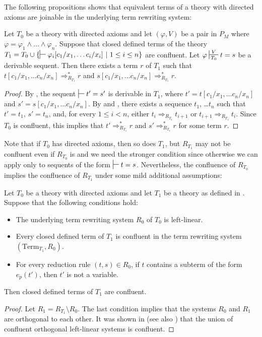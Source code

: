 \documentclass[reqno]{amsart}
\theoremstyle{definition}
\theoremstyle{remark}
\newcommand{\Term}{\mathrm{Term}}
\numberwithin{figure}{section}
\begin{document}
The following propositions shows that equivalent terms of a theory with directed axioms are joinable in the underlying term rewriting system:

\begin{prop}
Let $T_0$ be a theory with directed axioms and let $(\varphi,V)$ be a pair in $P_M$ where $\varphi = \varphi_1 \land \ldots \land \varphi_n$.
Suppose that closed defined terms of the theory $T_1 = T_0 \cup \{ \sststile{}{} \varphi_i[c_1/x_1, \ldots c_i/x_i]\ |\ 1 \leq i \leq n \}$ are confluent.
Let $\varphi \sststile{T_0}{V} t = s$ be a derivable sequent.
Then there exists a term $r$ of $T_1$ such that $t[c_1/x_1, \ldots c_n/x_n] \Rightarrow_{R_{T_1}}^* r$ and $s[c_1/x_1, \ldots c_n/x_n] \Rightarrow_{R_{T_1}}^* r$.
\end{prop}
\begin{proof}
By , the sequent $\sststile{}{} t' = s'$ is derivable in $T_1$, where $t' = t[c_1/x_1, \ldots c_n/x_n]$ and $s' = s[c_1/x_1, \ldots c_n/x_n]$.
By  and , there exists a sequence $t_1$, \ldots $t_n$ such that $t' = t_1$, $s' = t_n$, and, for every $1 \leq i < n$, either $t_i \Rightarrow_{R_{T_1}} t_{i+1}$ or $t_{i+1} \Rightarrow_{R_{T_1}} t_i$.
Since $T_0$ is confluent, this implies that $t' \Rightarrow_{R_{T_1}}^* r$ and $s' \Rightarrow_{R_{T_1}}^* r$ for some term $r$.
\end{proof}

Note that if $T_0$ has directed axioms, then so does $T_1$, but $R_{T_1}$ may not be confluent even if $R_{T_0}$ is
and we need the stronger condition since otherwise we can apply  only to sequents of the form $\sststile{}{} t = s$.
Nevertheless, the confluence of $R_{T_0}$ implies the confluence of $R_{T_1}$ under some mild additional assumptions:

\begin{lem}
Let $T_0$ be a theory with directed axioms and let $T_1$ be a theory as defined in .
Suppose that the following conditions hold:
\begin{itemize}
\item The underlying term rewriting system $R_0$ of $T_0$ is left-linear.
\item Every closed defined term of $T_1$ is confluent in the term rewriting system $(\Term_{T_1},R_0)$.
\item For every reduction rule $(t,s) \in R_0$, if $t$ contains a subterm of the form $e_p(t')$, then $t'$ is not a variable.
\end{itemize}
Then closed defined terms of $T_1$ are confluent.
\end{lem}
\begin{proof}
Let $R_1 = R_{T_1} \setminus R_0$.
The last condition implies that the systems $R_0$ and $R_1$ are orthogonal to each other.
It was shown in \cite{raoult} (see also \cite[Theorem~8.6.35]{ohlebusch-advanced}) that the union of confluent orthogonal left-linear systems is confluent.
\end{proof}
\end{document}
